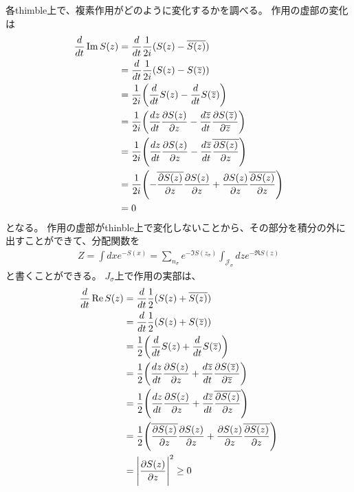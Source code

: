 \documentclass[]{ltjsarticle}
\newcommand{\del}{\partial}
\newcommand{\calJ}{\mathcal{J}}
\begin{document}
各thimble上で、複素作用がどのように変化するかを調べる。
作用の虚部の変化は
\begin{align}
	\frac{d}{dt} \Im S(z)
	&=
	\frac{d}{dt} \frac{1}{2i} (S(z) - \overline{S(z)}) \\
	&=
	\frac{d}{dt} \frac{1}{2i} (S(z) - S(\overline{z})) \\
	&=
	\frac{1}{2i} 
    \qty(
        \frac{d}{dt} S(z) - \frac{d}{d t} S(\overline{z})
    )\\
	&=
	\frac{1}{2i}
    \qty(
        \frac{dz}{dt} \frac{\del S(z)}{\del z} 
        - \frac{d\overline{z}}{dt} \frac{\del S(\overline{z})}{\del \overline{z}}     
    ) \\
	&=
	\frac{1}{2i}
    \qty(
        \frac{dz}{dt} \frac{\del S(z)}{\del z} 
        - \frac{d\overline{z}}{dt} \overline{\frac{\del S(z)}{\del z}}     
    ) \\
	&=
	\frac{1}{2i}
    \qty(
        -\overline{\frac{\del S(z)}{\del z}} \frac{\del S(z)}{\del z} 
        + \frac{\del S(z)}{\del z} \overline{\frac{\del S(z)}{\del z}}     
    )\\
	&=
	0
\end{align}
となる。
作用の虚部がthinble上で変化しないことから、その部分を積分の外に出すことができて、分配関数を
\begin{align}
	Z = \int dx e^{-S(x)} = \sum_{n_\sigma} e^{-\Im S(z_\sigma)} \int_{\calJ_\sigma} dz e^{-\Re S(z)}
\end{align}
と書くことができる。
$J_\sigma$上で作用の実部は、
\begin{align}
	\frac{d}{dt} \Re S(z)
	&=
	\frac{d}{dt} \frac{1}{2} (S(z) + \overline{S(z)}) \\
	&=
	\frac{d}{dt} \frac{1}{2} (S(z) + S(\overline{z})) \\
	&=
	\frac{1}{2} 
    \qty(
        \frac{d}{dt} S(z) + \frac{d}{d t} S(\overline{z})        
    ) \\
	&=
	\frac{1}{2}
    \qty(
        \frac{dz}{dt} \frac{\del S(z)}{\del z} 
        + \frac{d\overline{z}}{dt} \frac{\del S(\overline{z})}{\del \overline{z}}     
    ) \\
	&=
	\frac{1}{2}
    \qty(
        \frac{dz}{dt} \frac{\del S(z)}{\del z} 
        + \frac{d\overline{z}}{dt} \overline{\frac{\del S(z)}{\del z}}     
    )\\
	&=
	\frac{1}{2}
    \qty(
        \overline{\frac{\del S(z)}{\del z}} \frac{\del S(z)}{\del z} 
        + \frac{\del S(z)}{\del z} \overline{\frac{\del S(z)}{\del z}}     
    ) \\
	&=
	\Bigg| \frac{\del S(z)}{\del z} \Bigg|^2 \geq 0
\end{align}
\end{document}

